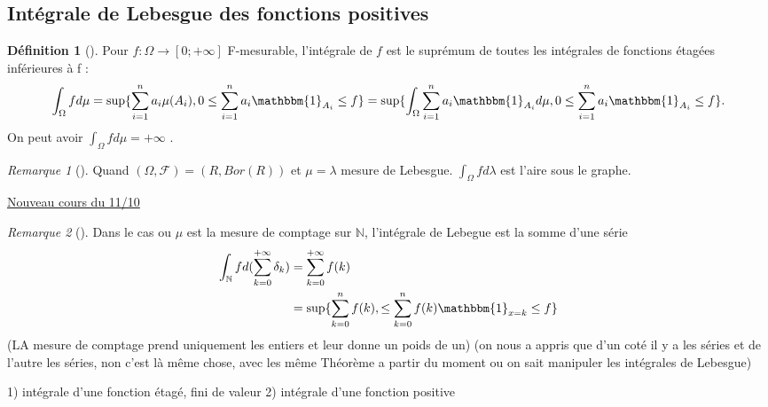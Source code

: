 \documentclass{article}
\theoremstyle{plain}%
\theoremstyle{definition}
\newtheorem{defn}{Définition}[section]
\theoremstyle{remark}
\newtheorem*{rem}{Remarque}
\begin{document}
\subsection{Intégrale de Lebesgue des fonctions positives}

\begin{defn}[]
    Pour $ f: \Omega \to [0; + \infty] $ F-mesurable, l'intégrale de $ f $ est le suprémum de toutes les intégrales de fonctions étagées inférieures à f : 
    \[
        \int_{\Omega }^{}fd \mu = \sup \{\sum_{i=1}^{n}a_i \mu (A_i), 0 \leq \sum_{i=1}^{n}a_i \mathbbm{1}_{A_i} \leq f\} = \sup \{ \int_{\Omega }^{} \sum_{i=1}^{n}a_i \mathbbm{1}_{A_i}d \mu , 0 \leq \sum_{i=1}^{n}a_i \mathbbm{1}_{A_i} \leq f\}
    .\]
    On peut avoir $ \int_{\Omega }^{}fd \mu = + \infty $ .
\end{defn}
\begin{rem}[]
    Quand $ (\Omega, \mathcal{F}) = (R, Bor(R)) $ et $ \mu = \lambda  $ mesure de Lebesgue. $ \int_{\Omega }^{}fd \lambda  $  est l'aire sous le graphe.
\end{rem}

\underline{Nouveau cours du 11/10} \\
\begin{rem}[]
    Dans le cas ou $ \mu  $ est la mesure de comptage sur $ \mathbb{N} $, l'intégrale de Lebegue est la somme d'une série 
    \begin{align*}
        \int_{\mathbb{N}}^{}fd(\sum_{k=0}^{+\infty }\delta _k) &= \sum_{k=0}^{+\infty }f(k) \\
            &= \sup \{ \sum_{k=0}^{n}f(k), \leq \sum_{k=0}^{n}f(k) \mathbbm{1}_{x=k} \leq f \}
    \end{align*}
    (LA mesure de comptage prend uniquement les entiers et leur donne un poids de un) (on nous a appris que d'un coté il y a les séries et de l'autre les séries, non c'est là même chose, avec les même Théorème a partir du moment ou on sait manipuler les intégrales de Lebesgue)
\end{rem}
1) intégrale d'une fonction étagé, fini de valeur 
2) intégrale d'une fonction positive
\end{document}
